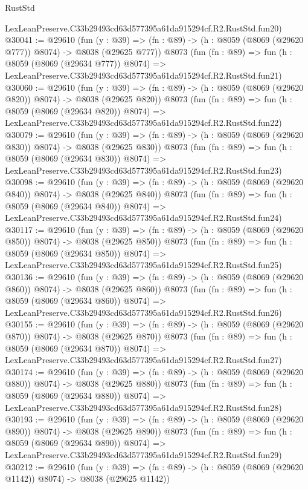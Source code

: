 \begin{lexlean}{RustStd}
\begin{coremodule}
    LexLeanPreserve.C33b29493cd63d577395a61da915294cf.R2.RustStd.fun20)
@30041 := @29610
    (fun (y : @39) => (fn : @89) -> (h : @8059 (@8069 (@29620 @777)) @8074) -> @8038 (@29625 @777))
    @8073
    (fun (fn : @89) =>
    fun (h : @8059 (@8069 (@29634 @777)) @8074) =>
    LexLeanPreserve.C33b29493cd63d577395a61da915294cf.R2.RustStd.fun21)
@30060 := @29610
    (fun (y : @39) => (fn : @89) -> (h : @8059 (@8069 (@29620 @820)) @8074) -> @8038 (@29625 @820))
    @8073
    (fun (fn : @89) =>
    fun (h : @8059 (@8069 (@29634 @820)) @8074) =>
    LexLeanPreserve.C33b29493cd63d577395a61da915294cf.R2.RustStd.fun22)
@30079 := @29610
    (fun (y : @39) => (fn : @89) -> (h : @8059 (@8069 (@29620 @830)) @8074) -> @8038 (@29625 @830))
    @8073
    (fun (fn : @89) =>
    fun (h : @8059 (@8069 (@29634 @830)) @8074) =>
    LexLeanPreserve.C33b29493cd63d577395a61da915294cf.R2.RustStd.fun23)
@30098 := @29610
    (fun (y : @39) => (fn : @89) -> (h : @8059 (@8069 (@29620 @840)) @8074) -> @8038 (@29625 @840))
    @8073
    (fun (fn : @89) =>
    fun (h : @8059 (@8069 (@29634 @840)) @8074) =>
    LexLeanPreserve.C33b29493cd63d577395a61da915294cf.R2.RustStd.fun24)
@30117 := @29610
    (fun (y : @39) => (fn : @89) -> (h : @8059 (@8069 (@29620 @850)) @8074) -> @8038 (@29625 @850))
    @8073
    (fun (fn : @89) =>
    fun (h : @8059 (@8069 (@29634 @850)) @8074) =>
    LexLeanPreserve.C33b29493cd63d577395a61da915294cf.R2.RustStd.fun25)
@30136 := @29610
    (fun (y : @39) => (fn : @89) -> (h : @8059 (@8069 (@29620 @860)) @8074) -> @8038 (@29625 @860))
    @8073
    (fun (fn : @89) =>
    fun (h : @8059 (@8069 (@29634 @860)) @8074) =>
    LexLeanPreserve.C33b29493cd63d577395a61da915294cf.R2.RustStd.fun26)
@30155 := @29610
    (fun (y : @39) => (fn : @89) -> (h : @8059 (@8069 (@29620 @870)) @8074) -> @8038 (@29625 @870))
    @8073
    (fun (fn : @89) =>
    fun (h : @8059 (@8069 (@29634 @870)) @8074) =>
    LexLeanPreserve.C33b29493cd63d577395a61da915294cf.R2.RustStd.fun27)
@30174 := @29610
    (fun (y : @39) => (fn : @89) -> (h : @8059 (@8069 (@29620 @880)) @8074) -> @8038 (@29625 @880))
    @8073
    (fun (fn : @89) =>
    fun (h : @8059 (@8069 (@29634 @880)) @8074) =>
    LexLeanPreserve.C33b29493cd63d577395a61da915294cf.R2.RustStd.fun28)
@30193 := @29610
    (fun (y : @39) => (fn : @89) -> (h : @8059 (@8069 (@29620 @890)) @8074) -> @8038 (@29625 @890))
    @8073
    (fun (fn : @89) =>
    fun (h : @8059 (@8069 (@29634 @890)) @8074) =>
    LexLeanPreserve.C33b29493cd63d577395a61da915294cf.R2.RustStd.fun29)
@30212 := @29610
    (fun (y : @39) =>
    (fn : @89) -> (h : @8059 (@8069 (@29620 @1142)) @8074) -> @8038 (@29625 @1142))

\end{coremodule}
\end{lexlean}

